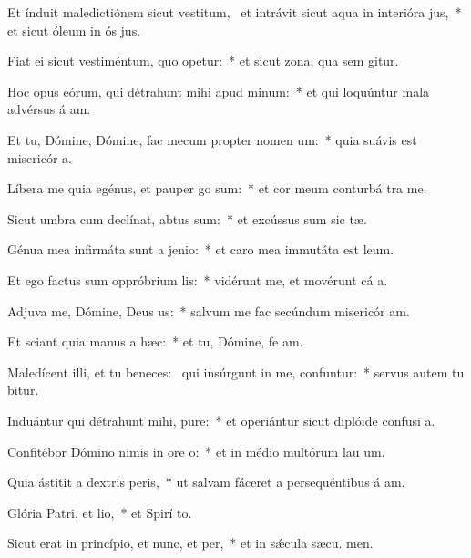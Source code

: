 \item Et índuit maledictiónem sicut vestitum,~\pscross{} et intrávit sicut aqua in interióra jus,~* et sicut óleum in ós jus.
\item Fiat ei sicut vestiméntum, quo opetur:~* et sicut zona, qua sem gitur.
\item Hoc opus eórum, qui détrahunt mihi apud minum:~* et qui loquúntur mala advérsus á am.
\item Et tu, Dómine, Dómine, fac mecum propter nomen um:~* quia suávis est misericór a.
\item Líbera me quia egénus, et pauper go sum:~* et cor meum conturbá  tra me.
\item Sicut umbra cum declínat, abtus sum:~* et excússus sum sic tæ.
\item Génua mea infirmáta sunt a jenio:~* et caro mea immutáta est  leum.
\item Et ego factus sum oppróbrium lis:~* vidérunt me, et movérunt cá a.
\item Adjuva me, Dómine, Deus us:~* salvum me fac secúndum misericór am.
\item Et sciant quia manus a hæc:~* et tu, Dómine, fe am.
\item Maledícent illi, et tu beneces:~\pscross{} qui insúrgunt in me, confuntur:~* servus autem tu bitur.
\item Induántur qui détrahunt mihi, pure:~* et operiántur sicut diplóide confusi a.
\item Confitébor Dómino nimis in ore o:~* et in médio multórum lau um.
\item Quia ástitit a dextris peris,~* ut salvam fáceret a persequéntibus á am.
\item Glória Patri, et lio,~* et Spirí to.
\item Sicut erat in princípio, et nunc, et per,~* et in sǽcula sæcu. men.
